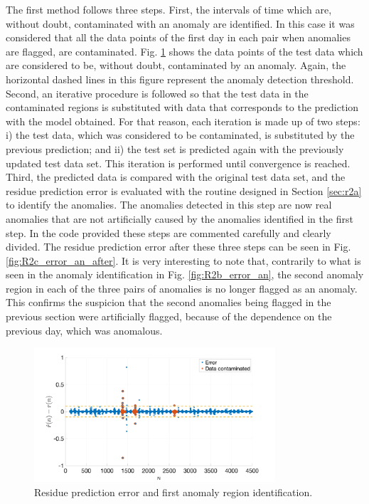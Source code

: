 \documentclass[a4paper, oneside, 11pt]{article}
\begin{document}
The first method follows three steps. First, the intervals of time which are, without doubt, contaminated with an anomaly are identified. In this case it was considered that all the data points of the first day in each pair when anomalies are flagged, are contaminated. Fig. \ref{fig:R2c_error_an} shows the data points of the test data which are considered to be, without doubt, contaminated by an anomaly. Again, the horizontal dashed lines in this figure represent the anomaly detection threshold. Second, an iterative procedure is followed so that the test data in the contaminated regions is substituted with data that corresponds to the prediction with the model obtained. For that reason, each iteration is made up of two steps: i) the test data, which was considered to be contaminated, is substituted by the previous prediction; and ii) the test set is predicted again with the previously updated test data set. This iteration is performed until convergence is reached. Third, the predicted data is compared with the original test data set, and the residue prediction error is evaluated with the routine designed in Section \ref{sec:r2a} to identify the anomalies. The anomalies detected in this step are now real anomalies that are not artificially caused by the anomalies identified in the first step. In the code provided these steps are commented carefully and clearly divided. The residue prediction error after these three steps can be seen in Fig. \ref{fig:R2c_error_an_after}. It is very interesting to note that, contrarily to what is seen in the anomaly identification in Fig. \ref{fig:R2b_error_an}, the second anomaly region in each of the three pairs of anomalies is no longer flagged as an anomaly. This confirms the suspicion that the second anomalies being flagged in the previous section were artificially flagged, because of the dependence on the previous day, which was anomalous. 

\begin{figure}[htbp]
	\centering
	\includegraphics[width= 0.8\textwidth]{figures/R2c_error_an.png}
	\caption{Residue prediction error and first anomaly region identification.}
	\label{fig:R2c_error_an}
\end{figure}
\end{document}
